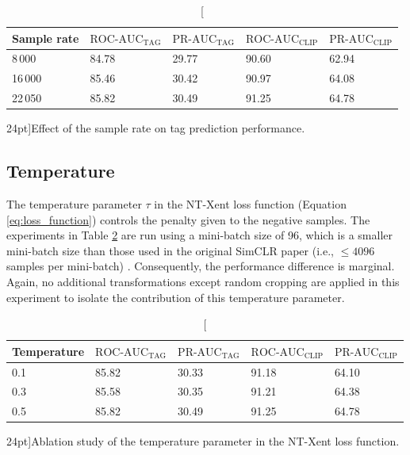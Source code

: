 \begin{table}
    \centering
        \begin{tabular}{lllll}\toprule
        Sample rate & $\text{ROC-AUC}_{\text{TAG}}$ & $\text{PR-AUC}_{\text{TAG}}$ & $\text{ROC-AUC}_{\text{CLIP}}$ & $\text{PR-AUC}_{\text{CLIP}}$ \\\midrule
        8\,000 & 84.78 & 29.77 & 90.60 & 62.94 \\
        16\,000 & 85.46 & 30.42 & 90.97 & 64.08 \\
        22\,050 & 85.82 & 30.49 & 91.25 & 64.78 \\                       
        \bottomrule
        \end{tabular}
    \caption[][24pt]{Effect of the sample rate on tag prediction performance.}
    \label{tab:sample_rate_ablation}
\end{table}


\subsection{Temperature}
The temperature parameter $\tau$ in the NT-Xent loss function (Equation \ref{eq:loss_function}) controls the penalty given to the negative samples. The experiments in Table \ref{tab:temperature_ablation} are run using a mini-batch size of 96, which is a smaller mini-batch size than those used in the original SimCLR paper (i.e., $\leq 4096$ samples per mini-batch) \cite{chen_simple_2020}. Consequently, the performance difference is marginal. Again, no additional transformations except random cropping are applied in this experiment to isolate the contribution of this temperature parameter.

\begin{table}
    \centering
    \begin{tabular}{lllll}\toprule
    Temperature & $\text{ROC-AUC}_{\text{TAG}}$ & $\text{PR-AUC}_{\text{TAG}}$ & $\text{ROC-AUC}_{\text{CLIP}}$ & $\text{PR-AUC}_{\text{CLIP}}$ \\\midrule
    0.1  & 85.82  & 30.33 & 91.18 & 64.10 \\
    0.3 & 85.58 & 30.35 & 91.21  & 64.38 \\
    0.5 & 85.82 & 30.49 & 91.25 & 64.78 \\                       
    \bottomrule
    \end{tabular}
    \caption[][24pt]{Ablation study of the temperature parameter in the NT-Xent loss function.}
    \label{tab:temperature_ablation}
\end{table}


